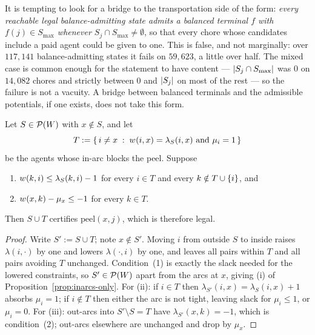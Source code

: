\begin{remark}
\label{rem:canonical-support-false}
It is tempting to look for a bridge to the transportation side of the form:
\emph{every reachable legal balance-admitting state admits a balanced terminal $f$
with $f(j) \in S_{\max}$ whenever $S_j \cap S_{\max} \ne \emptyset$}, so that
every chore whose candidates include a paid agent could be given to one. This is
false, and not marginally: over $117{,}141$ balance-admitting states it fails on
$59{,}623$, a little over half. The mixed case is common enough for the statement
to have content --- $\left\lvert S_j \cap S_{\max}\right\rvert$ was $0$ on $14{,}082$ chores and
strictly between $0$ and $\left\lvert S_j\right\rvert$ on most of the rest --- so the failure is not
a vacuity. A bridge between balanced terminals and the admissible potentials, if
one exists, does not take this form.
\end{remark}

\begin{lemma}
\label{lem:slack-transfer}
Let $S \in \mathcal{P}(W)$ with $x \notin S$, and let
\[
  T := \left\{\, i \ne x \;:\; w_{}(i,x) = \lambda_S(i,x) \text{ and } \mu_i = 1 \,\right\}
\]
be the agents whose in-arc blocks the peel. Suppose
\begin{enumerate}
  \item[(1)] $w_{}(k,i) \le \lambda_S(k,i) - 1$ for every $i \in T$ and every
    $k \notin T \cup \left\{i\right\}$, and
  \item[(2)] $w_{}(x,k) - \mu_x \le -1$ for every $k \in T$.
\end{enumerate}
Then $S \cup T$ certifies $\mathrm{peel}(x,j)$, which is therefore legal.
\end{lemma}

\begin{proof}
Write $S' := S \cup T$; note $x \notin S'$. Moving $i$ from outside $S$ to inside
raises $\lambda(i,\cdot)$ by one and lowers $\lambda(\cdot,i)$ by one, and leaves
all pairs within $T$ and all pairs avoiding $T$ unchanged. Condition~(1) is
exactly the slack needed for the lowered constraints, so $S' \in
\mathcal{P}(W)$ apart from the arcs at $x$, giving (i) of
Proposition~\ref{prop:inarcs-only}. For (ii): if $i \in T$ then $\lambda_{S'}(i,x)
= \lambda_S(i,x) + 1$ absorbs $\mu_i = 1$; if $i \notin T$ then either the arc is
not tight, leaving slack for $\mu_i \le 1$, or $\mu_i = 0$. For (iii): out-arcs
into $S' \setminus S = T$ have $\lambda_{S'}(x,k) = -1$, which is condition~(2);
out-arcs elsewhere are unchanged and drop by $\mu_x$.
\end{proof}

